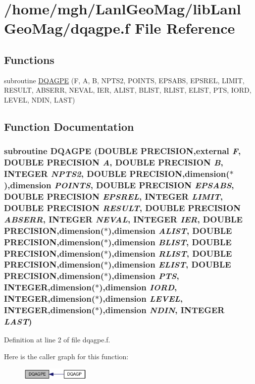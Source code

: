 \hypertarget{dqagpe_8f}{
\section{/home/mgh/LanlGeoMag/libLanlGeoMag/dqagpe.f File Reference}
\label{dqagpe_8f}
}
\subsection*{Functions}
\begin{CompactItemize}
\item 
subroutine \hyperlink{dqagpe_8f_8e4f830cdfce930181f12c0775ecfc49}{DQAGPE} (F, A, B, NPTS2, POINTS, EPSABS, EPSREL, LIMIT, RESULT, ABSERR, NEVAL, IER, ALIST, BLIST, RLIST, ELIST, PTS, IORD, LEVEL, NDIN, LAST)
\end{CompactItemize}


\subsection{Function Documentation}
\hypertarget{dqagpe_8f_8e4f830cdfce930181f12c0775ecfc49}{
\subsubsection[{DQAGPE}]{\setlength{\rightskip}{0pt plus 5cm}subroutine DQAGPE (DOUBLE PRECISION,external {\em F}, \/  DOUBLE PRECISION {\em A}, \/  DOUBLE PRECISION {\em B}, \/  INTEGER {\em NPTS2}, \/  DOUBLE PRECISION,dimension($\ast$),dimension {\em POINTS}, \/  DOUBLE PRECISION {\em EPSABS}, \/  DOUBLE PRECISION {\em EPSREL}, \/  INTEGER {\em LIMIT}, \/  DOUBLE PRECISION {\em RESULT}, \/  DOUBLE PRECISION {\em ABSERR}, \/  INTEGER {\em NEVAL}, \/  INTEGER {\em IER}, \/  DOUBLE PRECISION,dimension($\ast$),dimension {\em ALIST}, \/  DOUBLE PRECISION,dimension($\ast$),dimension {\em BLIST}, \/  DOUBLE PRECISION,dimension($\ast$),dimension {\em RLIST}, \/  DOUBLE PRECISION,dimension($\ast$),dimension {\em ELIST}, \/  DOUBLE PRECISION,dimension($\ast$),dimension {\em PTS}, \/  INTEGER,dimension($\ast$),dimension {\em IORD}, \/  INTEGER,dimension($\ast$),dimension {\em LEVEL}, \/  INTEGER,dimension($\ast$),dimension {\em NDIN}, \/  INTEGER {\em LAST})}}
\label{dqagpe_8f_8e4f830cdfce930181f12c0775ecfc49}




Definition at line 2 of file dqagpe.f.

Here is the caller graph for this function:\nopagebreak
\begin{figure}[H]
\begin{center}
\leavevmode
\includegraphics[width=95pt]{dqagpe_8f_8e4f830cdfce930181f12c0775ecfc49_icgraph}
\end{center}
\end{figure}
